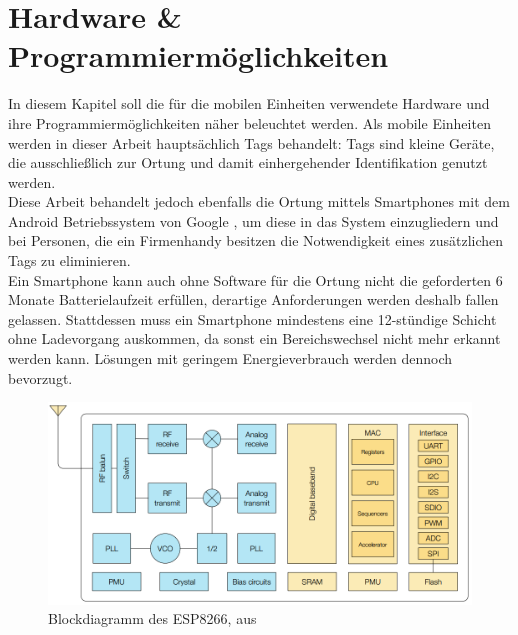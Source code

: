\chapter{Hardware \& Programmiermöglichkeiten}
\label{ch:hardprog}
In diesem Kapitel soll die für die mobilen Einheiten verwendete Hardware und ihre Programmiermöglichkeiten näher beleuchtet werden.
Als mobile Einheiten werden in dieser Arbeit hauptsächlich Tags behandelt: Tags sind kleine Geräte, die ausschließlich zur Ortung und damit einhergehender Identifikation genutzt werden.\\
Diese Arbeit behandelt jedoch ebenfalls die Ortung mittels Smartphones mit dem Android Betriebssystem von Google \cite{google2017android}, um diese in das System einzugliedern und bei Personen, die ein Firmenhandy besitzen die Notwendigkeit eines zusätzlichen Tags zu eliminieren.\\
Ein Smartphone kann auch ohne Software für die Ortung nicht die geforderten 6 Monate Batterielaufzeit erfüllen, derartige Anforderungen werden deshalb fallen gelassen. 
Stattdessen muss ein Smartphone mindestens eine 12-stündige Schicht ohne Ladevorgang auskommen, da sonst ein Bereichswechsel nicht mehr erkannt werden kann.
Lösungen mit geringem Energieverbrauch werden dennoch bevorzugt.

\begin{figure}[h]
  \centering
	\includegraphics[width=\textwidth]{images/espblock.png}
  \caption{Blockdiagramm des ESP8266, aus \cite{espressif2017esp8266}}
  \label{fig:espblock}
\end{figure}

